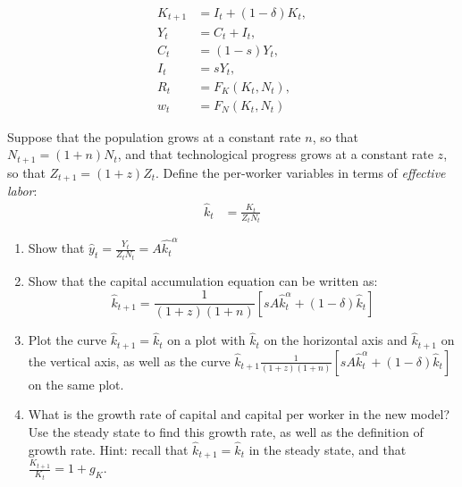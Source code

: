 \documentclass[11pt]{article}
\begin{document}
\begin{align*}
    K_{t+1} &= I_t + (1 - \delta)K_t, \\
    Y_t &= C_t + I_t, \\
    C_t &= (1 - s)Y_t, \\
    I_t &= sY_t, \\
    R_t &= F_K(K_t, N_t), \\
    w_t &= F_N(K_t, N_t)
\end{align*}


Suppose that the population grows at a constant rate \(n\), so that \(N_{t+1} = (1 + n)N_t\),
and that technological progress grows at a constant rate \(z\), so that \(Z_{t+1} = (1 + z)Z_t\).
Define the per-worker variables in terms of \textit{effective labor}:
\begin{align*}
    \hat{k}_t   &= \frac{K_t}{Z_tN_t}
\end{align*}

\begin{enumerate}
    \item Show that \(    \hat{y}_t   = \frac{Y_t}{Z_tN_t}   = A\hat{k_t}^\alpha\)
    \item Show that the capital accumulation equation can be written as:
    \[\hat{k}_{t+1} = \frac{1}{(1+z)(1+n)}[sA\hat{k}_t^\alpha + (1 - \delta)\hat{k}_t]\]
    \item Plot the curve \(\hat{k}_{t+1} = \hat{k}_t\) on a plot with \(\hat{k}_t\) on the horizontal axis and \(\hat{k}_{t+1}\) on the vertical axis,
    as well as the curve \(\hat{k}_{t+1} \frac{1}{(1+z)(1+n)}[sA\hat{k}_t^\alpha + (1 - \delta)\hat{k}_t] \) on the same plot.
    \item What is the growth rate of capital and capital per worker 
    in the new model? 
    Use the steady state to find this growth rate, as well as the definition of growth rate.
    Hint: recall that \(\hat{k}_{t+1} = \hat{k}_t\) in the steady state, 
    and that \(\frac{K_{t+1}}{K_t} = 1 + g_K\).
\end{enumerate}
\end{document}

